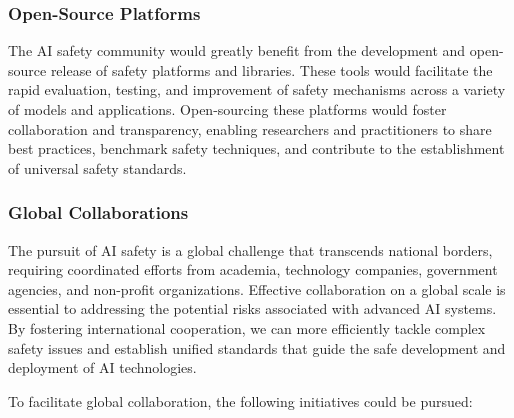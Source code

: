 \subsubsection{Open-Source Platforms}

The AI safety community would greatly benefit from the development and open-source release of safety platforms and libraries. These tools would facilitate the rapid evaluation, testing, and improvement of safety mechanisms across a variety of models and applications. Open-sourcing these platforms would foster collaboration and transparency, enabling researchers and practitioners to share best practices, benchmark safety techniques, and contribute to the establishment of universal safety standards.


\subsubsection{Global Collaborations}

The pursuit of AI safety is a global challenge that transcends national borders, requiring coordinated efforts from academia, technology companies, government agencies, and non-profit organizations. Effective collaboration on a global scale is essential to addressing the potential risks associated with advanced AI systems. By fostering international cooperation, we can more efficiently tackle complex safety issues and establish unified standards that guide the safe development and deployment of AI technologies.

To facilitate global collaboration, the following initiatives could be pursued:


